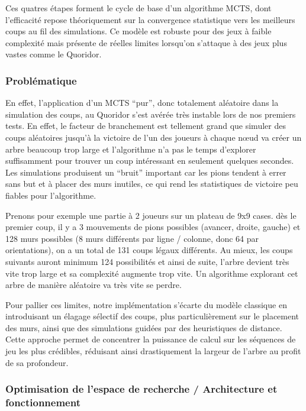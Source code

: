 \documentclass[a4paper]{article}
\begin{document}
Ces quatres étapes forment le cycle de base d’un algorithme MCTS, dont l’efficacité repose théoriquement sur la convergence statistique vers 
les meilleurs coups au fil des simulations. Ce modèle est robuste pour des jeux à faible complexité mais présente de réelles limites lorsqu’on 
s’attaque à des jeux plus vastes comme le Quoridor.

\subsubsection{Problématique}

En effet, l’application d’un MCTS “pur”, donc totalement aléatoire dans la simulation des coups, au Quoridor s’est avérée très instable 
lors de nos premiers tests. En effet, le facteur de branchement est tellement grand que simuler des coups aléatoires jusqu’à la victoire de 
l’un des joueurs à chaque nœud va créer un arbre beaucoup trop large et l’algorithme n’a pas le temps d’explorer suffisamment pour trouver 
un coup intéressant en seulement quelques secondes. Les simulations produisent un “bruit” important car les pions tendent à errer sans but 
et à placer des murs inutiles, ce qui rend les statistiques de victoire peu fiables pour l’algorithme. 

Prenons pour exemple une partie à 2 joueurs sur un plateau de 9x9 cases. dès le premier coup, il y a 3 mouvements de pions possibles 
(avancer, droite, gauche) et 128 murs possibles (8 murs différents par ligne / colonne, donc 64 par orientations), on a un total de 131 coups 
légaux différents. Au mieux, les coups suivants auront minimum 124 possibilités et ainsi de suite, l’arbre devient très vite trop large et 
sa complexité augmente trop vite. Un algorithme explorant cet arbre de manière aléatoire va très vite se perdre.

\bigskip

Pour pallier ces limites, notre implémentation s’écarte du modèle classique en introduisant un élagage sélectif des coups, 
plus particulièrement sur le placement des murs, ainsi que des simulations guidées par des heuristiques de distance. 
Cette approche permet de concentrer la puissance de calcul sur les séquences de jeu les plus crédibles, réduisant ainsi drastiquement 
la largeur de l’arbre au profit de sa profondeur.

\subsubsection{Optimisation de l’espace de recherche / Architecture et fonctionnement}
\end{document}

